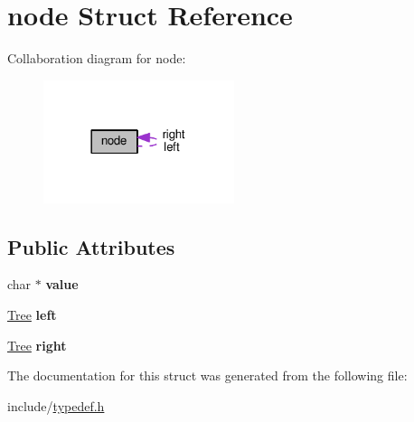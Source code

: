 \hypertarget{structnode}{}\section{node Struct Reference}
\label{structnode}


Collaboration diagram for node\+:\nopagebreak
\begin{figure}[H]
\begin{center}
\leavevmode
\includegraphics[width=158pt]{structnode__coll__graph}
\end{center}
\end{figure}
\subsection*{Public Attributes}
\begin{DoxyCompactItemize}
\item 
char $\ast$ {\bfseries value}\hypertarget{structnode_a0d2c1eb2a9662a891bb09807232d7f9f}{}\label{structnode_a0d2c1eb2a9662a891bb09807232d7f9f}

\item 
\hyperlink{structnode}{Tree} {\bfseries left}\hypertarget{structnode_a8bb8b7799bf138f227ce9d05ba8d3ca4}{}\label{structnode_a8bb8b7799bf138f227ce9d05ba8d3ca4}

\item 
\hyperlink{structnode}{Tree} {\bfseries right}\hypertarget{structnode_ade8fc5b5eff73152fc0b9c5c6ca6f0dd}{}\label{structnode_ade8fc5b5eff73152fc0b9c5c6ca6f0dd}

\end{DoxyCompactItemize}


The documentation for this struct was generated from the following file\+:\begin{DoxyCompactItemize}
\item 
include/\hyperlink{typedef_8h}{typedef.\+h}\end{DoxyCompactItemize}

